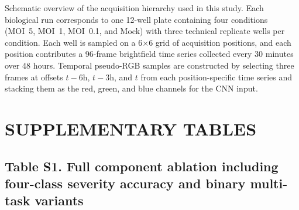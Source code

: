 \documentclass[12pt,letterpaper]{article}
\begin{document}
Schematic overview of the acquisition hierarchy used in this study.
Each biological run corresponds to one 12-well plate containing four conditions (MOI~5, MOI~1, MOI~0.1, and Mock) with three technical replicate wells per condition.
Each well is sampled on a 6$\times$6 grid of acquisition positions, and each position contributes a 96-frame brightfield time series collected every 30 minutes over 48 hours.
Temporal pseudo-RGB samples are constructed by selecting three frames at offsets $t{-}6$h, $t{-}3$h, and $t$ from each position-specific time series and stacking them as the red, green, and blue channels for the CNN input.

\newpage

\section*{SUPPLEMENTARY TABLES}

\subsection*{Table S1. Full component ablation including four-class severity accuracy and binary multi-task variants}
\end{document}
